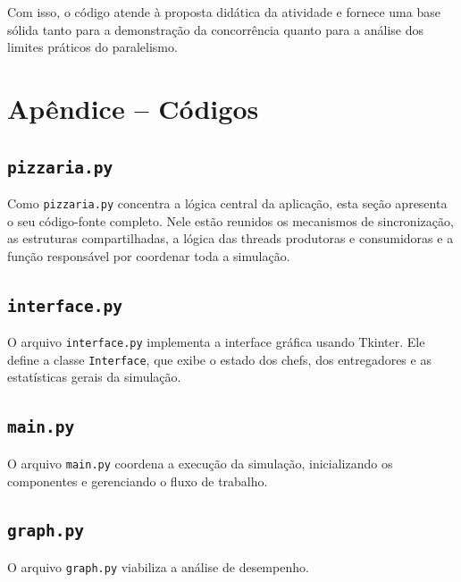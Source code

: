 \documentclass[12pt,a4paper]{article}
\begin{document}
Com isso, o c\'odigo atende \`a proposta did\'atica da atividade e fornece uma base s\'olida tanto para a demonstra\c{c}\~ao da concorr\^encia quanto para a an\'alise dos limites pr\'aticos do paralelismo.

\clearpage
\section{Ap\^endice -- C\'odigos}
\subsection{\texttt{pizzaria.py}}
Como \texttt{pizzaria.py} concentra a l\'ogica central da aplica\c{c}\~ao, esta se\c{c}\~ao apresenta o seu c\'odigo-fonte completo. Nele est\~ao reunidos os mecanismos de sincroniza\c{c}\~ao, as estruturas compartilhadas, a l\'ogica das threads produtoras e consumidoras e a fun\c{c}\~ao respons\'avel por coordenar toda a simula\c{c}\~ao.

{\footnotesize

}

\subsection{\texttt{interface.py}}
O arquivo \texttt{interface.py} implementa a interface gr\'afica usando Tkinter. Ele define a classe \texttt{Interface}, que exibe o estado dos chefs, dos entregadores e as estat\'isticas gerais da simula\c{c}\~ao.
{\footnotesize

}

\subsection{\texttt{main.py}}
O arquivo \texttt{main.py} coordena a execu\c{c}\~ao da simula\c{c}\~ao, inicializando os componentes e gerenciando o fluxo de trabalho.
{\footnotesize

}

\subsection{\texttt{graph.py}}
O arquivo \texttt{graph.py} viabiliza a an\'alise de desempenho.
{\footnotesize

}
\end{document}
